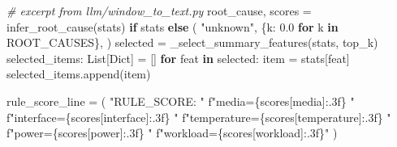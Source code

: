 \documentclass[
  11pt,
  a4paper]{article}
\newenvironment{Shaded}{}{}
\newcommand{\CommentTok}[1]{\textcolor[rgb]{0.38,0.63,0.69}{\textit{#1}}}
\newcommand{\ControlFlowTok}[1]{\textcolor[rgb]{0.00,0.44,0.13}{\textbf{#1}}}
\newcommand{\FloatTok}[1]{\textcolor[rgb]{0.25,0.63,0.44}{#1}}
\newcommand{\KeywordTok}[1]{\textcolor[rgb]{0.00,0.44,0.13}{\textbf{#1}}}
\newcommand{\NormalTok}[1]{#1}
\newcommand{\OperatorTok}[1]{\textcolor[rgb]{0.40,0.40,0.40}{#1}}
\newcommand{\SpecialCharTok}[1]{\textcolor[rgb]{0.25,0.44,0.63}{#1}}
\newcommand{\SpecialStringTok}[1]{\textcolor[rgb]{0.73,0.40,0.53}{#1}}
\newcommand{\StringTok}[1]{\textcolor[rgb]{0.25,0.44,0.63}{#1}}
\begin{document}
\begin{Shaded}
\begin{Highlighting}[]
\CommentTok{\# excerpt from llm/window\_to\_text.py}
\NormalTok{root\_cause, scores }\OperatorTok{=}\NormalTok{ infer\_root\_cause(stats) }\ControlFlowTok{if}\NormalTok{ stats }\ControlFlowTok{else}\NormalTok{ (}
    \StringTok{"unknown"}\NormalTok{,}
\NormalTok{    \{k: }\FloatTok{0.0} \ControlFlowTok{for}\NormalTok{ k }\KeywordTok{in}\NormalTok{ ROOT\_CAUSES\},}
\NormalTok{)}
\NormalTok{selected }\OperatorTok{=}\NormalTok{ \_select\_summary\_features(stats, top\_k)}
\NormalTok{selected\_items: List[Dict] }\OperatorTok{=}\NormalTok{ []}
\ControlFlowTok{for}\NormalTok{ feat }\KeywordTok{in}\NormalTok{ selected:}
\NormalTok{    item }\OperatorTok{=}\NormalTok{ stats[feat]}
\NormalTok{    selected\_items.append(item)}

\NormalTok{rule\_score\_line }\OperatorTok{=}\NormalTok{ (}
    \StringTok{"RULE\_SCORE: "}
    \SpecialStringTok{f"media=}\SpecialCharTok{\{}\NormalTok{scores[}\StringTok{\textquotesingle{}media\textquotesingle{}}\NormalTok{]}\SpecialCharTok{:.3f\}}\SpecialStringTok{ "}
    \SpecialStringTok{f"interface=}\SpecialCharTok{\{}\NormalTok{scores[}\StringTok{\textquotesingle{}interface\textquotesingle{}}\NormalTok{]}\SpecialCharTok{:.3f\}}\SpecialStringTok{ "}
    \SpecialStringTok{f"temperature=}\SpecialCharTok{\{}\NormalTok{scores[}\StringTok{\textquotesingle{}temperature\textquotesingle{}}\NormalTok{]}\SpecialCharTok{:.3f\}}\SpecialStringTok{ "}
    \SpecialStringTok{f"power=}\SpecialCharTok{\{}\NormalTok{scores[}\StringTok{\textquotesingle{}power\textquotesingle{}}\NormalTok{]}\SpecialCharTok{:.3f\}}\SpecialStringTok{ "}
    \SpecialStringTok{f"workload=}\SpecialCharTok{\{}\NormalTok{scores[}\StringTok{\textquotesingle{}workload\textquotesingle{}}\NormalTok{]}\SpecialCharTok{:.3f\}}\SpecialStringTok{"}
\NormalTok{)}


\end{Highlighting}
\end{Shaded}
\end{document}
